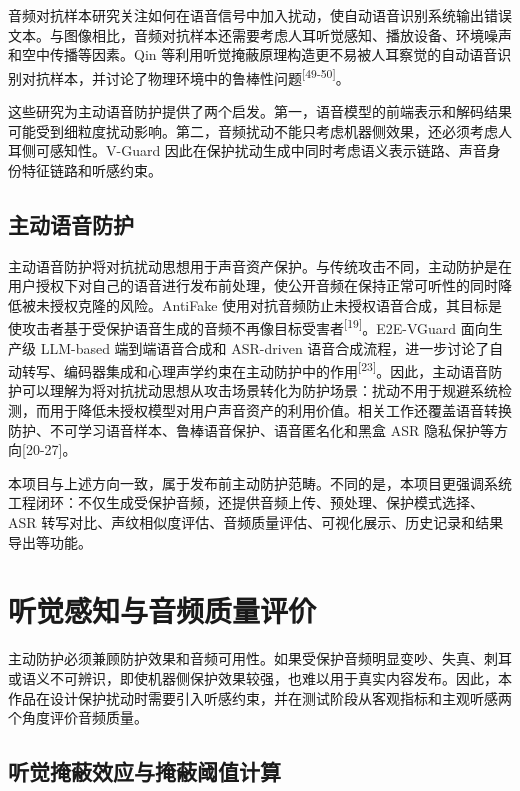 音频对抗样本研究关注如何在语音信号中加入扰动，使自动语音识别系统输出错误文本。与图像相比，音频对抗样本还需要考虑人耳听觉感知、播放设备、环境噪声和空中传播等因素。Qin
等利用听觉掩蔽原理构造更不易被人耳察觉的自动语音识别对抗样本，并讨论了物理环境中的鲁棒性问题\textsuperscript{{[}49-50{]}}。

这些研究为主动语音防护提供了两个启发。第一，语音模型的前端表示和解码结果可能受到细粒度扰动影响。第二，音频扰动不能只考虑机器侧效果，还必须考虑人耳侧可感知性。V-Guard
因此在保护扰动生成中同时考虑语义表示链路、声音身份特征链路和听感约束。

\subsection{主动语音防护}\label{ux4e3bux52a8ux8bedux97f3ux9632ux62a4}

主动语音防护将对抗扰动思想用于声音资产保护。与传统攻击不同，主动防护是在用户授权下对自己的语音进行发布前处理，使公开音频在保持正常可听性的同时降低被未授权克隆的风险。AntiFake
使用对抗音频防止未授权语音合成，其目标是使攻击者基于受保护语音生成的音频不再像目标受害者\textsuperscript{{[}19{]}}。E2E-VGuard
面向生产级 LLM-based 端到端语音合成和 ASR-driven
语音合成流程，进一步讨论了自动转写、编码器集成和心理声学约束在主动防护中的作用\textsuperscript{{[}23{]}}。因此，主动语音防护可以理解为将对抗扰动思想从攻击场景转化为防护场景：扰动不用于规避系统检测，而用于降低未授权模型对用户声音资产的利用价值。相关工作还覆盖语音转换防护、不可学习语音样本、鲁棒语音保护、语音匿名化和黑盒
ASR 隐私保护等方向{[}20-27{]}。

本项目与上述方向一致，属于发布前主动防护范畴。不同的是，本项目更强调系统工程闭环：不仅生成受保护音频，还提供音频上传、预处理、保护模式选择、ASR
转写对比、声纹相似度评估、音频质量评估、可视化展示、历史记录和结果导出等功能。

\section{听觉感知与音频质量评价}\label{ux542cux89c9ux611fux77e5ux4e0eux97f3ux9891ux8d28ux91cfux8bc4ux4ef7}

主动防护必须兼顾防护效果和音频可用性。如果受保护音频明显变吵、失真、刺耳或语义不可辨识，即使机器侧保护效果较强，也难以用于真实内容发布。因此，本作品在设计保护扰动时需要引入听感约束，并在测试阶段从客观指标和主观听感两个角度评价音频质量。

\subsection{听觉掩蔽效应与掩蔽阈值计算}\label{ux542cux89c9ux63a9ux853dux6548ux5e94ux4e0eux63a9ux853dux9608ux503cux8ba1ux7b97}

